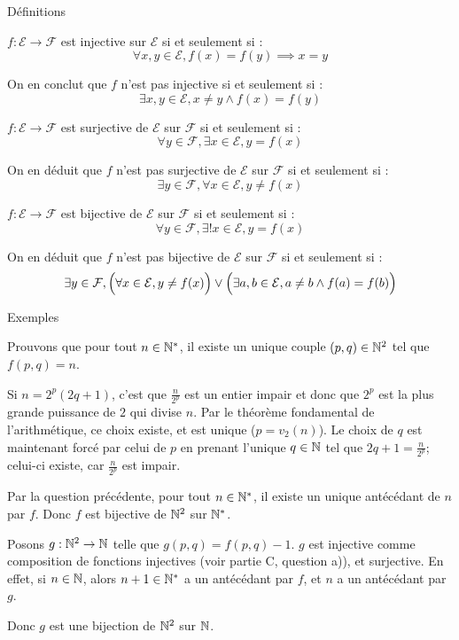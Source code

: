 \documentclass[]{../templates/homework}
\begin{document}
\newcommand{\E}{\mathcal E}
\newcommand{\F}{\mathcal F}

 {Définitions}
\subproblem

$f: \E \rightarrow \F$ est injective sur $\E$ si et seulement si :
$$\forall x,y \in \E, f(x) = f(y) \implies x = y$$

On en conclut que $f$ n'est pas injective si et seulement si :
$$\exists x,y \in \E, x \neq y \land f(x) = f(y)$$

\subproblem
$f: \E \rightarrow \F$ est surjective de $\E$ sur $\F$ si et seulement si :
$$\forall y \in \F, \exists x \in \E, y = f(x)$$

On en déduit que $f$ n'est pas surjective de $\E$ sur $\F$ si et seulement si :
$$\exists y \in \F, \forall x\in\E, y \neq f(x)$$

\subproblem
$f: \E \rightarrow \F$ est bijective de $\E$ sur $\F$ si et seulement si :
$$\forall y \in \F, \exists ! x \in \E, y = f(x)$$

On en déduit que $f$ n'est pas bijective de $\E$ sur $\F$ si et seulement si :
$$\exists y \in \F,\Bigl(\forall x\in\E, y \neq f(x)\Bigr) \lor \Bigl(\exists a,b\in\E, a\neq b \land f(a) = f(b)\Bigr)$$

 {Exemples}
\subproblem

\subproblem

\subproblem
\question Prouvons que pour tout $n\in\mathbb N^{*}$, il existe un unique couple $(p,q) \in \mathbb N^{2}$ tel que $f(p,q)= n$.

Si $n=2^{p}(2q+1)$, c'est que $\frac {n} {2^{p}}$ est un entier impair et donc que $2^{p}$ est la plus grande puissance de $2$ qui divise $n$. Par le théorème fondamental de l'arithmétique, ce choix existe, et est unique ($p = v_{2}(n)$). Le choix de $q$ est maintenant forcé par celui de $p$ en prenant l'unique $q\in\mathbb N$ tel que $2q+1 = \frac n {2^{p}}$; celui-ci existe, car $\frac n {2^{p}}$ est impair.

\question Par la question précédente, pour tout $n\in\mathbb N^{*}$, il existe un unique antécédant de $n$ par $f$. Donc $f$ est bijective de $\mathbb N^{2}$ sur $\mathbb N^{*}$.

\question Posons $g: \mathbb N^{2} \rightarrow \mathbb N$ telle que $g(p,q) = f(p,q)-1$. $g$ est injective comme composition de fonctions injectives (voir partie C, question a)), et surjective. En effet, si $n\in\mathbb N$, alors $n+1 \in \mathbb N^{*}$ a un antécédant par $f$, et $n$ a un antécédant par $g$.

Donc $g$ est une bijection de $\mathbb N^{2}$ sur $\mathbb N$.
\end{document}
